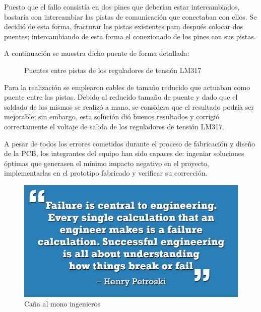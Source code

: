 \begin{itemize}
    Puesto que el fallo consistía en dos pines que deberían estar intercambiados, bastaría con intercambiar las pistas de comunicación que conectaban con ellos. Se decidió de esta forma, fracturar las pistas existentes para después colocar dos puentes; intercambiando de esta forma el conexionado de los pines con sus pistas.
    
    A continuación se muestra dicho puente de forma detallada:
    
    \begin{figure}[H]
    \centering
    \caption{Puentes entre pistas de los reguladores de tensión LM317}
    \label{fig:lego}
    \end{figure}
    
    Para la realización se emplearon cables de tamaño reducido que actuaban como puente entre las pistas. Debido al reducido tamaño de puente  y dado que el soldado de los mismos se realizó a mano, se considera que el resultado podría ser mejorable; sin embargo, esta solución dió buenos resultados y corrigió correctamente el voltaje de salida de los reguladores de tensión LM317.
    
\end{itemize}

A pesar de todos los errores cometidos durante el proceso de fabricación y diseño de la \ac{PCB}, los integrantes del equipo han sido capaces de: ingeniar soluciones óptimas que generasen el mínimo impacto negativo en el proyecto, implementarlas en el prototipo fabricado y verificar su corrección.

 \begin{figure}[H]
    \centering 
    \includegraphics[width=0.5\linewidth]{pictures/Quote.jpg}
    \caption{Caña al mono ingenieros}
    \label{fig:kdiagram}
 \end{figure}


